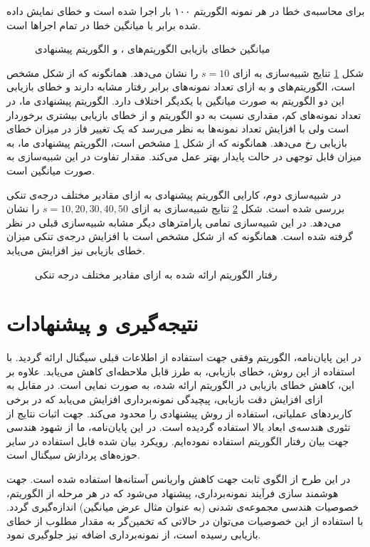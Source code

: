 برای محاسبه‌ی خطا در هر نمونه الگوریتم ۱۰۰ بار اجرا شده است و خطای نمایش داده شده برابر با میانگین خطا در تمام اجرا‌ها است.

\begin{figure}[t]
	\centering
	
	\caption{میانگین خطای بازیابی الگوریتم‌های 
	،
	و الگوریتم پیشنهادی}
	\label{fig:SimFig1}
\end{figure}

شکل
\ref{fig:SimFig1}
تنایج شبیه‌سازی به ازای
$s=10$
را نشان می‌دهد.
همانگونه که از شکل مشخص است، الگوریتم‌های
و
به ازای تعداد نمونه‌های برابر رفتار مشابه دارند و خطای بازیابی این دو الگوریتم به صورت میانگین
با یکدیگر اختلاف دارد.
الگوریتم پیشنهادی ما، در تعداد نمونه‌های کم، مقداری نسبت به دو الگوریتم
و
از خطای بازیابی بیشتری برخوردار است ولی با افزایش تعداد نمونه‌ها به نظر می‌رسد که یک تغییر فاز در میزان خطای بازیابی رخ می‌دهد. همانگونه که از شکل
\ref{fig:SimFig1}
مشخص است، الگوریتم پیشنهادی ما، به میزان قابل توجهی در حالت پایدار بهتر عمل می‌کند. مقدار تفاوت در این شبیه‌سازی به صورت میانگین
است.


در شبیه‌سازی دوم، کارایی الگوریتم پیشنهادی به ازای مقادیر مختلف درجه‌ی تنکی بررسی شده است. شکل 
\ref{fig:SimFig2}
نتایج شبیه‌سازی به ازای 
$ s=10,20,30,40,50 $
را نشان می‌دهد. در این شبیه‌سازی تمامی پارامتر‌های دیگر مشابه شبیه‌سازی قبلی در نظر گرفته شده است. همانگونه که از شکل مشخص است با افزایش درجه‌ی تنکی میزان خطای بازیابی نیز افزایش می‌یابد.
\begin{figure}[t]
	\centering
	
	\caption{رفتار الگوریتم ارائه شده به ازای مقادیر مختلف درجه تنکی}
	\label{fig:SimFig2}
\end{figure}

\newpage
\section{نتیجه‌گیری و پیشنهادات}
در این پایان‌نامه، الگوریتم وفقی جهت استفاده از اطلاعات قبلی سیگنال ارائه گردید. با استفاده از این روش، خطای بازیابی، به طرز قابل ملاحظه‌ای کاهش می‌یابد. علاوه بر این، کاهش خطای بازیابی در الگوریتم ارائه شده، به صورت نمایی است. در مقابل به ازای افزایش دقت بازیابی، پیچیدگی نمونه‌برداری افزایش می‌یابد که در برخی کاربردهای عملیاتی، استفاده از روش پیشنهادی را محدود می‌کند. جهت اثبات نتایج از تئوری هندسه‌ی ابعاد بالا استفاده گردیده است.
در این پایان‌نامه، ما از شهود هندسی جهت بیان رفتار الگوریتم استفاده نموده‌ایم. رویکرد بیان شده قابل استفاده در سایر حوزه‌های پردازش سیگنال است. 

در این طرح از الگوی ثابت جهت کاهش واریانس آستانه‌ها استفاده شده است. جهت هوشمند سازی فرآیند نمونه‌برداری، پیشنهاد می‌شود که در هر مرحله از الگوریتم، خصوصیات هندسی مجموعه‌ی شدنی (به عنوان مثال عرض میانگین) اندازه‌گیری گردد.  با استفاده از این خصوصیات می‌توان در حالاتی که تخمین‌گر به مقدار مطلوب از خطای بازیابی رسیده است، از نمونه‌برداری اضافه نیز جلوگیری نمود.





